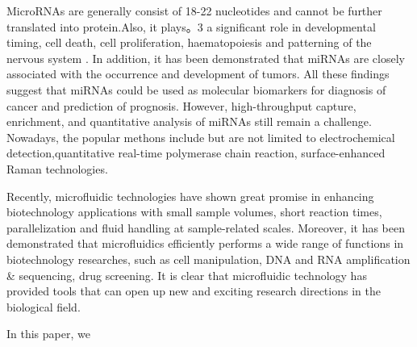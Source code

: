 \documentclass[twoside,twocolumn,9pt]{article}
\begin{document}
MicroRNAs are generally consist of  18-22 nucleotides and cannot be further translated into protein.Also, it plays。3 a significant role in developmental timing, cell death, cell proliferation, haematopoiesis and patterning of the nervous system \cite{ambros2004functions,bartel2004micrornas}. In addition, it has been demonstrated that miRNAs are closely associated with the occurrence and development of tumors\cite{zhang2007micrornas,zhao2013microrna,he2007guardian,kent2006small}. All these findings suggest that miRNAs could be used as molecular biomarkers for diagnosis of cancer and prediction of prognosis\cite{luo2011microrna,herreros2019plasma}. However, high-throughput capture, enrichment, and quantitative analysis of miRNAs  still  remain a challenge. Nowadays, the popular methons include but are not limited to electrochemical detection\cite{masud2019nanoarchitecture},quantitative real-time polymerase chain reaction, surface-enhanced Raman  technologies\cite{lee2019quantitative}.

Recently, microfluidic technologies have shown great promise in enhancing biotechnology applications with small sample volumes, short reaction times, parallelization and fluid handling at sample-related scales\cite{RIORDON2019310}. Moreover, it has been demonstrated that microfluidics  efficiently performs a wide range of functions in biotechnology researches, such as cell manipulation\cite{yun2013cell,gao2019recent,wang2011enhanced,mu2013microfluidics}, DNA and RNA amplification \& sequencing\cite{giuffrida2017integration,chang2013nucleic,liu2019bacterial}, drug screening\cite{mitxelena2019improved,shang2019microfluidic}. It is clear that microfluidic technology has provided tools that can open up new and exciting research directions in the biological field.

In this paper, we








\end{document}
